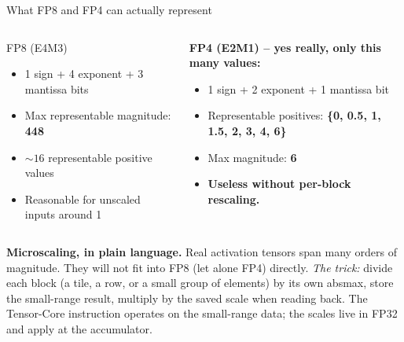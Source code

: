 \documentclass[10pt,aspectratio=169]{beamer}
\begin{document}
\begin{frame}{What FP8 and FP4 can actually represent}
  \begin{columns}[T]
      \begin{block}{FP8 (E4M3)}
        \begin{itemize}
          \item 1 sign + 4 exponent + 3 mantissa bits
          \item Max representable magnitude: \textbf{448}
          \item $\sim 16$ representable positive values
          \item Reasonable for unscaled inputs around 1
        \end{itemize}
      \end{block}
      \begin{watchout}
        \textbf{FP4 (E2M1) -- yes really, only this many values:}
        \begin{itemize}
          \item 1 sign + 2 exponent + 1 mantissa bit
          \item Representable positives:
                \textbf{\{0, 0.5, 1, 1.5, 2, 3, 4, 6\}}
          \item Max magnitude: \textbf{6}
          \item \textbf{Useless without per-block rescaling.}
        \end{itemize}
      \end{watchout}
  \end{columns}
  \vspace{0.5em}
  \begin{aha}
    \textbf{Microscaling, in plain language.} Real activation tensors
    span many orders of magnitude. They will not fit into FP8 (let
    alone FP4) directly. \emph{The trick:} divide each block (a tile,
    a row, or a small group of elements) by its own absmax, store the
    small-range result, multiply by the saved scale when reading back.
    The Tensor-Core instruction operates on the small-range data; the
    scales live in FP32 and apply at the accumulator.
  \end{aha}
\end{frame}
\end{document}
